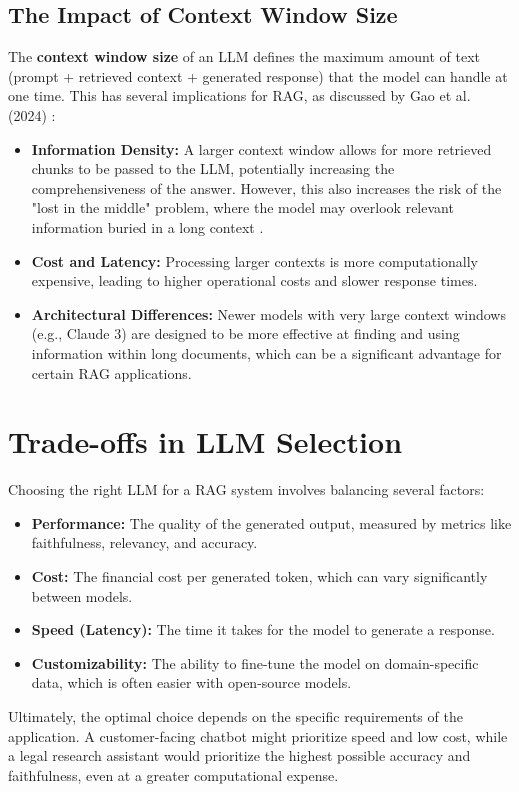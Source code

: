 \subsection{The Impact of Context Window Size}
The \textbf{context window size} of an LLM defines the maximum amount of text (prompt + retrieved context + generated response) that the model can handle at one time. This has several implications for RAG, as discussed by Gao et al. (2024) \autocite{gao2024retrievalaugmented}:
\begin{itemize}
    \item \textbf{Information Density:} A larger context window allows for more retrieved chunks to be passed to the LLM, potentially increasing the comprehensiveness of the answer. However, this also increases the risk of the "lost in the middle" problem, where the model may overlook relevant information buried in a long context \autocite{liu2023lost}.
    \item \textbf{Cost and Latency:} Processing larger contexts is more computationally expensive, leading to higher operational costs and slower response times.
    \item \textbf{Architectural Differences:} Newer models with very large context windows (e.g., Claude 3) are designed to be more effective at finding and using information within long documents, which can be a significant advantage for certain RAG applications.
\end{itemize}

\section{Trade-offs in LLM Selection}
Choosing the right LLM for a RAG system involves balancing several factors:
\begin{itemize}
    \item \textbf{Performance:} The quality of the generated output, measured by metrics like faithfulness, relevancy, and accuracy.
    \item \textbf{Cost:} The financial cost per generated token, which can vary significantly between models.
    \item \textbf{Speed (Latency):} The time it takes for the model to generate a response.
    \item \textbf{Customizability:} The ability to fine-tune the model on domain-specific data, which is often easier with open-source models.
\end{itemize}

Ultimately, the optimal choice depends on the specific requirements of the application. A customer-facing chatbot might prioritize speed and low cost, while a legal research assistant would prioritize the highest possible accuracy and faithfulness, even at a greater computational expense.
